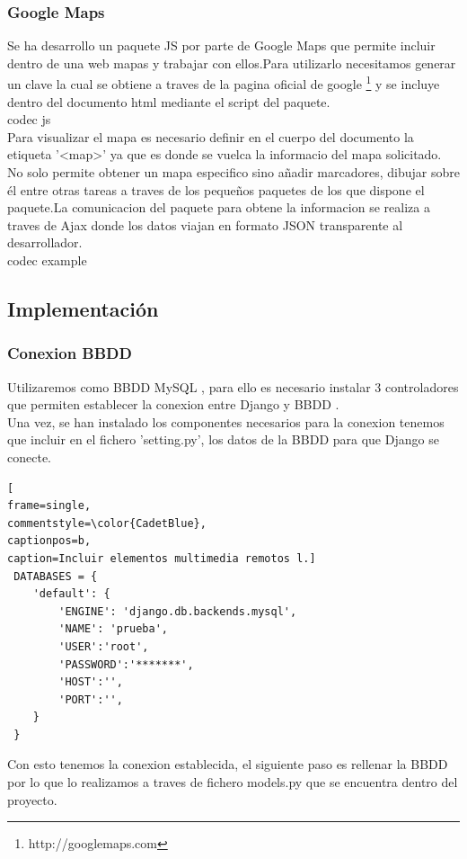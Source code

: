 \subsubsection{Google Maps}
Se ha desarrollo un paquete JS por parte de Google Maps que permite incluir dentro de una web mapas y trabajar con ellos.Para utilizarlo necesitamos generar un clave la cual se obtiene a traves de la pagina oficial de google \footnote{http://googlemaps.com} y se incluye dentro del documento html mediante el script del paquete.
\\ codec js 
\\ Para visualizar el mapa es necesario definir en el cuerpo del documento la etiqueta '<map>' ya que es donde se vuelca la informacio del mapa solicitado. No solo permite obtener un mapa especifico sino añadir marcadores, dibujar sobre él entre otras tareas a traves de los pequeños paquetes de los que dispone el paquete.La comunicacion del paquete para obtene la informacion se realiza a traves de Ajax donde los datos viajan en formato JSON transparente al desarrollador.
\\ codec example \\
\subsection{Implementación}
\subsubsection{Conexion BBDD}
Utilizaremos como BBDD MySQL , para ello es necesario instalar 3 controladores que permiten establecer la conexion entre Django y BBDD .
\\Una vez, se han instalado los componentes necesarios para la conexion tenemos que incluir en el fichero 'setting.py',  los datos de la BBDD para que Django se conecte.
\begin{lstlisting}[
frame=single,
commentstyle=\color{CadetBlue},
captionpos=b,
caption=Incluir elementos multimedia remotos l.]
 DATABASES = {
    'default': {
        'ENGINE': 'django.db.backends.mysql',
        'NAME': 'prueba',
        'USER':'root',
        'PASSWORD':'*******',
        'HOST':'',
        'PORT':'',
    }
 }
\end{lstlisting}
Con esto tenemos la conexion establecida, el siguiente paso es rellenar la BBDD por lo que lo realizamos a traves de fichero models.py que se encuentra dentro del proyecto.
